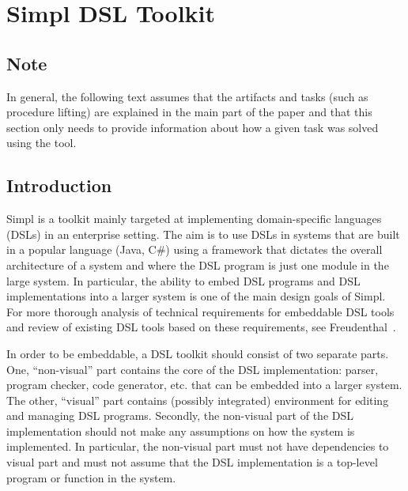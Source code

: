 \section{Simpl DSL Toolkit}


\subsection{Note}

In general, the following text assumes that the artifacts and tasks
(such as procedure lifting) are explained in the main part of the
paper and that this section only needs to provide information about
how a given task was solved using the tool.


\subsection{Introduction}

Simpl is a toolkit mainly targeted at implementing domain-specific
languages (DSLs) in an enterprise setting. The aim is to use DSLs
in systems that are built in a popular language (Java, C\#) using
a framework that dictates the overall architecture of a system and
where the DSL program is just one module in the large system. In particular,
the ability to embed DSL programs and DSL implementations into a larger
system is one of the main design goals of Simpl. For more thorough
analysis of technical requirements for embeddable DSL tools and review
of existing DSL tools based on these requirements, see Freudenthal~\cite{enterprise-dsl}.

In order to be embeddable, a DSL toolkit should consist of two separate
parts. One, {}``non-visual'' part contains the core of the DSL implementation:
parser, program checker, code generator, etc. that can be embedded
into a larger system. The other, {}``visual'' part contains (possibly
integrated) environment for editing and managing DSL programs. Secondly,
the non-visual part of the DSL implementation should not make any
assumptions on how the system is implemented. In particular, the non-visual
part must not have dependencies to visual part and must not assume
that the DSL implementation is a top-level program or function in
the system.

